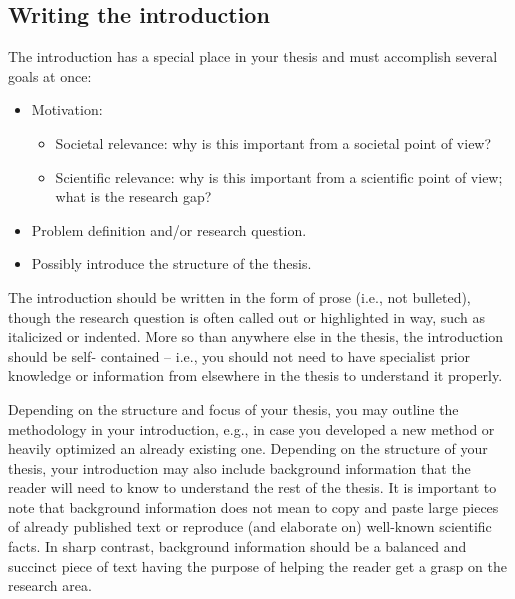 \documentclass{article}
\begin{document}
\subsection{Writing the introduction}
The introduction has a special place in your thesis and must accomplish several goals at once:
\begin{itemize}
    \item Motivation:
    \begin{itemize}
        \item Societal relevance: why is this important from a societal point of view?
        \item Scientific relevance: why is this important from a scientific point of view; what is the research gap?
    \end{itemize}
    \item Problem definition and/or research question.
    \item Possibly introduce the structure of the thesis.
\end{itemize}

The introduction should be written in the form of prose (i.e., not bulleted), though the research question is often called out or highlighted in way, such as italicized or indented. More so than anywhere else in the thesis, the introduction should be self- contained – i.e., you should not need to have specialist prior knowledge or information from elsewhere in the thesis to understand it properly.

Depending on the structure and focus of your thesis, you may outline the methodology in your introduction, e.g., in case you developed a new method or heavily optimized an already existing one. Depending on the structure of your thesis, your introduction may also include background information that the reader will need to know to understand the rest of the thesis. It is important to note that background information does not mean to copy and paste large pieces of already published text or reproduce (and elaborate on) well-known scientific facts. In sharp contrast, background information should be a balanced and succinct piece of text having the purpose of helping the reader get a grasp on the research area.
\end{document}
